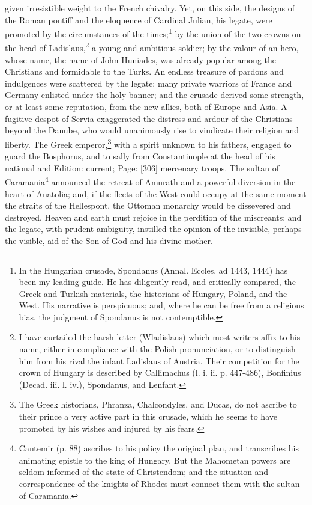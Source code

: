 given irresistible weight to the French chivalry. Yet, on this side, the designs of the Roman pontiff and the eloquence of Cardinal Julian, his legate, were promoted by the circumstances of the times;\footnote{In the Hungarian crusade, Spondanus (Annal. Eccles. ad 1443, 1444) has been my leading guide. He has diligently read, and critically compared, the Greek and Turkish materials, the historians of Hungary, Poland, and the West. His narrative is perspicuous; and, where he can be free from a religious bias, the judgment of Spondanus is not contemptible.} by the union of the two crowns on the head of Ladislaus,\footnote{I have curtailed the harsh letter (Wladislaus) which most writers affix to his name, either in compliance with the Polish pronunciation, or to distinguish him from his rival the infant Ladislaus of Austria. Their competition for the crown of Hungary is described by Callimachus (l. i. ii. p. 447-486), Bonfinius (Decad. iii. l. iv.), Spondanus, and Lenfant.} a young and ambitious soldier; by the valour of an hero, whose name, the name of John Huniades, was already popular among the Christians and formidable to the Turks. An endless treasure of pardons and indulgences were scattered by the legate; many private warriors of France and Germany enlisted under the holy banner; and the crusade derived some strength, or at least some reputation, from the new allies, both of Europe and Asia. A fugitive despot of Servia exaggerated the distress and ardour of the Christians beyond the Danube, who would unanimously rise to vindicate their religion and liberty. The Greek emperor,\footnote{The Greek historians, Phranza, Chalcondyles, and Ducas, do not ascribe to their prince a very active part in this crusade, which he seems to have promoted by his wishes and injured by his fears.} with a spirit unknown to his fathers, engaged to guard the Bosphorus, and to sally from Constantinople at the head of his national and Edition: current; Page: [306] mercenary troops. The sultan of Caramania\footnote{Cantemir (p. 88) ascribes to his policy the original plan, and transcribes his animating epistle to the king of Hungary. But the Mahometan powers are seldom informed of the state of Christendom; and the situation and correspondence of the knights of Rhodes must connect them with the sultan of Caramania.} announced the retreat of Amurath and a powerful diversion in the heart of Anatolia; and, if the fleets of the West could occupy at the same moment the straits of the Hellespont, the Ottoman monarchy would be dissevered and destroyed. Heaven and earth must rejoice in the perdition of the miscreants; and the legate, with prudent ambiguity, instilled the opinion of the invisible, perhaps the visible, aid of the Son of God and his divine mother.


